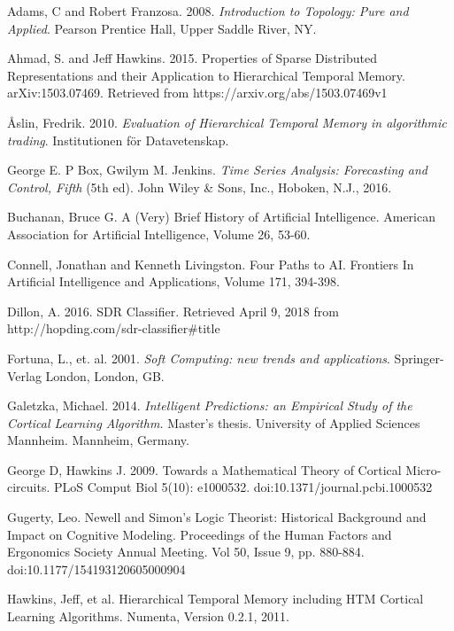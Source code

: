 \documentclass[oneside,12pt,openany]{book}
\begin{document}
	\newpage
	\begin{thebibliography}{99}
				
		 Adams, C and Robert Franzosa. 2008. \textit{Introduction to Topology: Pure and Applied}. Pearson Prentice Hall, Upper Saddle River, NY.
				
		 Ahmad, S. and Jeff Hawkins. 2015. Properties of Sparse Distributed Representations and their Application to Hierarchical Temporal Memory. arXiv:1503.07469. Retrieved from https://arxiv.org/abs/1503.07469v1
		
		 \r{A}slin, Fredrik. 2010. \textit{Evaluation of Hierarchical Temporal Memory in algorithmic trading}. Institutionen f\"{o}r Datavetenskap.
		
		 George E. P Box, Gwilym M. Jenkins. \emph{Time Series Analysis: Forecasting and Control, Fifth} (5th ed). John Wiley \& Sons, Inc., Hoboken, N.J., 2016.
		
		 Buchanan, Bruce G. A (Very) Brief History of Artificial Intelligence. American Association for Artificial Intelligence, Volume 26, 53-60.
		
		 Connell, Jonathan and Kenneth Livingston. Four Paths to AI. Frontiers In Artificial Intelligence and Applications, Volume 171, 394-398.
		
		 Dillon, A. 2016. SDR Classifier. Retrieved April 9, 2018 from http://hopding.com/sdr-classifier\#title
		
		 Fortuna, L., et. al. 2001. \textit{Soft Computing: new trends and applications}. Springer-Verlag London, London, GB.
		
		 Galetzka, Michael. 2014. \emph{Intelligent Predictions: an Empirical Study of the Cortical Learning Algorithm.} Master's thesis. University of Applied Sciences Mannheim. Mannheim, Germany. 
		
		 George D, Hawkins J. 2009. Towards a Mathematical Theory of Cortical Micro-circuits. PLoS Comput Biol 5(10): e1000532. doi:10.1371/journal.pcbi.1000532 
		
		 Gugerty, Leo. Newell and Simon's Logic Theorist: Historical Background and Impact on Cognitive Modeling. Proceedings of the Human Factors and Ergonomics Society Annual Meeting. Vol 50, Issue 9, pp. 880-884.  doi:10.1177/154193120605000904
		
		 Hawkins, Jeff, et al. Hierarchical Temporal Memory including HTM Cortical Learning Algorithms. Numenta, Version 0.2.1, 2011. 
		

\end{thebibliography}
\end{document}
